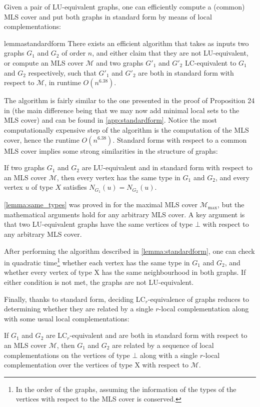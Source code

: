 \documentclass[a4paper,UKenglish,cleveref,autoref,thm-restate]{arxiv}
\begin{document}
Given a pair of LU-equivalent graphs, one can efficiently compute a (common) MLS cover and put both graphs in standard form by means of local complementations:

\begin{restatable}{lemma}{standardform} \label{lemma:standardform}
    There exists an efficient algorithm that takes as inputs two graphs $G_1$ and $G_2$ of order $n$, and either claim that they are not LU-equivalent, or compute an MLS cover $\mathcal M$ and two graphs $G'_1$ and $G'_2$ LC-equivalent to $G_1$ and $G_2$ respectively, such that $G'_1$ and $G'_2$ are both in standard form with respect to $\mathcal M$, in runtime $O(n^{6.38})$.
\end{restatable}

The algorithm is fairly similar to the one presented in the proof of Proposition 24 in \cite{claudet2024local} (the main difference being that we may now add minimal local sets to the MLS cover) and can be found in \cref{app:standardform}. Notice the most computationally expensive step of the algorithm is the computation of the MLS cover, hence the runtime $O(n^{6.38})$. Standard forms with respect to a common MLS cover implies some strong similarities in the structure of graphs:

\begin{lemma} \label{lemma:same_types}
    If two graphs $G_1$ and $G_2$ are LU-equivalent and in standard form with respect to an MLS cover $\mathcal M$, then every vertex has the same type in $G_1$ and $G_2$, and  every vertex $u$ of type $X$ satisfies $N_{G_1}(u) = N_{G_2}(u)$. 
\end{lemma}

\cref{lemma:same_types} was proved in \cite{claudet2024local} for the maximal MLS cover $\mathcal M_\text{max}$, but the mathematical arguments hold for any arbitrary MLS cover. A key argument is that two LU-equivalent graphs have the same vertices of type $\bot$ with respect to any arbitrary MLS cover. 


After performing the algorithm described in \cref{lemma:standardform}, one can check in quadratic time\footnote{In the order of the graphs, assuming the information of the types of the vertices with respect to the MLS cover is conserved.} whether each vertex has the same type  in $G_1$ and $G_2$, and whether every vertex of type X has the same neighbourhood in both graphs. If either condition is not met, the graphs are not LU-equivalent.


Finally, thanks to standard form, deciding LC$_r$-equivalence of graphs reduces to determining whether they are related by a single $r$-local complementation along with some usual local complementations:
\begin{lemma} \label{lemma:standardform_LCr_lc}
    If $G_1$ and $G_2$ are LC$_r$-equivalent and are both in standard form with respect to an MLS cover $\mathcal M$, then $G_1$ and $G_2$ are related by a sequence of local complementations on the vertices of type $\bot$ along with a single $r$-local complementation over the vertices of type X with respect to $\mathcal M$.
\end{lemma}
\end{document}
